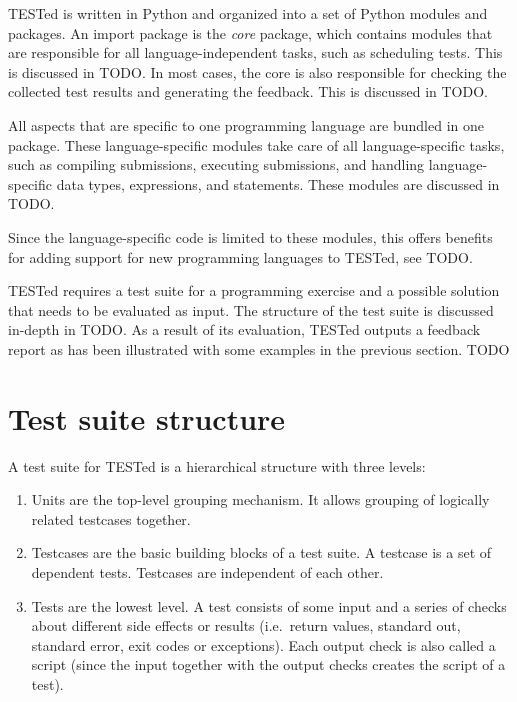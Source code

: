\documentclass[../main]{subfiles}
\begin{document}
TESTed is written in Python and organized into a set of Python modules and packages.
An import package is the \emph{core} package, which contains modules that are responsible for all language-independent tasks, such as scheduling tests.
This is discussed in TODO.
In most cases, the core is also responsible for checking the collected test results and generating the feedback.
This is discussed in TODO.

All aspects that are specific to one programming language are bundled in one package.
These language-specific modules take care of all language-specific tasks, such as compiling submissions, executing submissions, and handling language-specific data types, expressions, and statements.
These modules are discussed in TODO.

Since the language-specific code is limited to these modules, this offers benefits for adding support for new programming languages to TESTed, see TODO.

TESTed requires a test suite for a programming exercise and a possible solution that needs to be evaluated as input.
The structure of the test suite is discussed in-depth in TODO.
As a result of its evaluation, TESTed outputs a feedback report as has been illustrated with some examples in the previous section. TODO


\section{Test suite structure}
\label{sec:test-suite-structure}

A test suite for TESTed is a hierarchical structure with three levels:


\begin{enumerate}
    \item Units are the top-level grouping mechanism.
          It allows grouping of logically related testcases together.
    \item Testcases are the basic building blocks of a test suite.
          A testcase is a set of dependent tests.
          Testcases are independent of each other.
    \item Tests are the lowest level.
          A test consists of some input and a series of checks about different side effects or results (i.e.\ return values, standard out, standard error, exit codes or exceptions).
          Each output check is also called a script (since the input together with the output checks creates the script of a test).
\end{enumerate}
\end{document}
